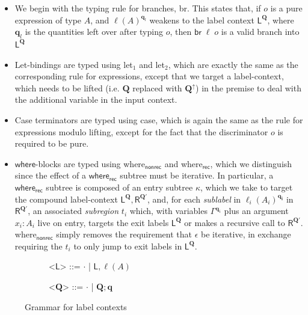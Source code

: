 \documentclass[acmsmall,screen,anonymous,review]{acmart}
\newcommand{\mb}[1]{\ensuremath{\mathbf{#1}}}
\newcommand{\ms}[1]{\ensuremath{\mathsf{#1}}}
\newcommand{\brb}[2]{\ms{br}\;#1\;#2}
\newcommand{\lhyp}[2]{#1(#2)}
\newcommand{\brle}[1]{{\textsf{#1}}}
\newcommand{\zeroqv}[1]{#1^\uparrow}
\begin{document}
\begin{itemize}
  \item We begin with the typing rule for branches, \brle{br}. This states that, if $o$ is a pure
  expression of type $A$, and $\ell(A)^{\mb{q}_l}$ weakens to the label context 
  $\ms{L}^{\mb{Q}}$, where $\mb{q}_l$ is the quantities left over after typing $o$, then
  $\brb{\ell}{o}$ is a valid branch into $\ms{L}^{\mb{Q}}$
  \item Let-bindings are typed using \brle{let$_1$} and \brle{let$_2$}, which are exactly the same
  as the corresponding rule for expressions, except that we target a label-context, which needs to
  be lifted (i.e. $\mb{Q}$ replaced with $\zeroqv{\mb{Q}}$) in the premise to deal with the 
  additional variable in the input context.
  \item Case terminators are typed using \brle{case}, which is again the same as the rule for 
  expressions modulo lifting, except for the fact that the discriminator $o$ is required to be
  pure.
  \item \ms{where}-blocks are typed using \brle{where$_\ms{nonrec}$} and \brle{where$_\ms{rec}$},
  which we distinguish since the effect of a \ms{where_{rec}} subtree must be iterative. In
  particular, a  \ms{where_{rec}} subtree is composed of an entry subtree $\kappa$, which we take to
  target the compound label-context $\ms{L}^{\mb{Q}}, \ms{R}^{\mb{Q}'}$, and, for each
  \emph{sublabel} in $\ell_i(A_i)^{\mb{q_i}}$ in $\ms{R}^{\mb{Q}'}$, an associated \emph{subregion}
  $t_i$ which, with variables $\Gamma^{\mb{q}_i}$ plus an argument $x_i : A_i$ live on entry,
  targets the exit labels $\ms{L}^{\mb{Q}}$ or makes a recursive call to $\ms{R}^{\mb{Q}'}$.
  \brle{where$_\ms{nonrec}$} simply removes the requirement that $\epsilon$ be iterative, in
  exchange requiring the $t_i$ to only jump to exit labels in $\ms{L}^{\mb{Q}}$.
\end{itemize}

\begin{figure}
  \hspace{4em}
  \begin{subfigure}[t]{.25\textwidth}
  \begin{grammar}
    <\(\ms{L}\)> ::= \(\cdot\) \;|\; \(\ms{L}, \lhyp{\ell}{A}\)
  \end{grammar}
  \end{subfigure}%
  \begin{subfigure}[t]{.25\textwidth}
  \begin{grammar}
    <\(\mb{Q}\)> ::= \(\cdot\) \;|\; \(\mb{Q}; \mb{q}\)
  \end{grammar}
  \end{subfigure}%
  \caption{Grammar for label contexts}
  \Description{}
  \label{fig:label-grammar}
\end{figure}
\end{document}
